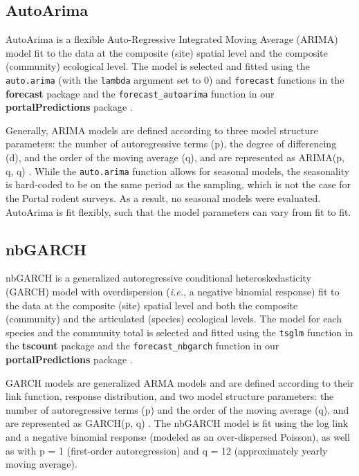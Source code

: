 \documentclass{article}
\def\code#1{\texttt{#1}}
\begin{document}
\subsection{AutoArima}
\label{subsec:currmods_aa}

AutoArima is a flexible Auto-Regressive Integrated Moving Average (ARIMA) model fit to the data at the composite (site) spatial level and the composite (community) ecological level. The model is selected and fitted using the \code{auto.arima} (with the \code{lambda} argument set to 0) and \code{forecast} functions in the \textbf{forecast} package \citep{Hyndman2013, Hyndman2017} and the \code{forecast\_autoarima} function in our \textbf{portalPredictions} package \citep{PortalPredictions}.

Generally, ARIMA models are defined according to three model structure parameters: the number of autoregressive terms (p), the degree of differencing (d), and the order of the moving average (q), and are represented as ARIMA(p, q, q) \citep{Box1970}. While the \code{auto.arima} function allows for seasonal models, the seasonality is hard-coded to be on the same period as the sampling, which is not the case for the Portal rodent surveys. As a result, no seasonal models were evaluated. AutoArima is fit flexibly, such that the model parameters can vary from fit to fit.

\subsection{nbGARCH}
\label{subsec:currmods_nbgarch}

nbGARCH is a generalized autoregressive conditional heteroskedasticity (GARCH) model with overdispersion (\emph{i.e.}, a negative binomial response) fit to the data at the composite (site) spatial level and both the composite (community) and the articulated (species) ecological levels. The model for each species and the community total is selected and fitted using the \code{tsglm} function in the \textbf{tscount} package \citep{Liboschik2017a} and the \code{forecast\_nbgarch} function in our \textbf{portalPredictions} package \citep{PortalPredictions}.

GARCH models are generalized ARMA models and are defined according to their link function, response distribution, and two model structure parameters: the number of autoregressive terms (p) and the order of the moving average (q), and are represented as GARCH(p, q) \citep{Liboschik2017a}. The nbGARCH model is fit using the log link and a negative binomial response (modeled as an over-dispersed Poisson), as well as with p = 1 (first-order autoregression) and q = 12 (approximately yearly moving average).
\end{document}
